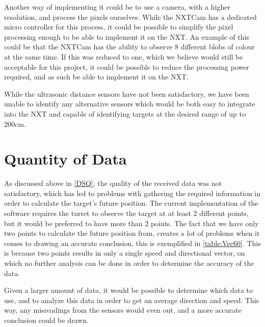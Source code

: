 Another way of implementing it could be to use a camera,
with a higher resolution, and process the pixels ourselves. While the
NXTCam has a dedicated micro controller for this process, it could be possible
to simplify the pixel processing enough to be able to implement it on the
NXT. An example of this could be that the NXTCam has the ability to observe 8
different blobs of colour at the same time. If this was reduced to one, which
we believe would still be acceptable for this project, it could be possible to
reduce the processing power required, and as such be able to implement it on the
NXT.\nl

While the ultrasonic distance sensors have not been satisfactory, we have been
unable to identify any alternative sensors which would be both easy to integrate
into the NXT and capable of identifying targets at the desired range
of up to 200cm.

\section{Quantity of Data}
As discussed above in \autoref{DSQ}, the quality of the received data was not
satisfactory, which has led to problems with gathering the required information
in order to calculate the target's future position. The current implementation
of the \name software requires the turret to observe the target at at least 2
different points, but it would be preferred to have more than 2 points.
The fact that we have only two points to calculate the future position from,
creates a lot of problems when it comes to drawing an accurate conclusion, this
is exemplified in \autoref{table:Vec60}.
This is because two points results in only a single speed and directional vector, on
which no further analysis can be done in order to determine the accuracy of the
data.\nl

Given a larger amount of data, it would be possible to determine which data to
use, and to analyze this data in order to get an average direction and speed.
This way, any misreadings from the sensors would even out, and a more accurate
conclusion could be drawn.\nl

